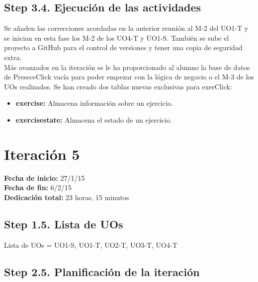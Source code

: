 \subsection{Step 3.4. Ejecución de las actividades}
\label{it4:3.4}

Se añaden las correcciones acordadas en la anterior reunión al M-2 del UO1-T y se inician en esta fase los M-2 de los UO4-T y UO1-S. También se sube el proyecto a GitHub para el control de versiones y tener una copia de seguridad extra.\\

Más avanzados en la iteración se le ha proporcionado al alumno la base de datos de PreseceClick vacía para poder empezar con la lógica de negocio o el M-3 de los UOs realizados. Se han creado dos tablas nuevas exclusivas para exerClick:

\begin{itemize}
\item \textbf{exercise:} Almacena información sobre un ejercicio.
\item \textbf{exercisestate:} Almacena el estado de un ejercicio.
\end{itemize}


\section{Iteración 5}
\label{it5}

\begin{flushleft}
\textbf{Fecha de inicio:} 27/1/15\\
\textbf{Fecha de fin:} 6/2/15\\
\textbf{Dedicación total:} 23 horas, 15 minutos\\
\end{flushleft}

\subsection{Step 1.5. Lista de UOs}
\label{it5:1.5}

Lista de UOs = {UO1-S, UO1-T, UO2-T, UO3-T, UO4-T}

\subsection{Step 2.5. Planificación de la iteración}
\label{it5:2.5}

